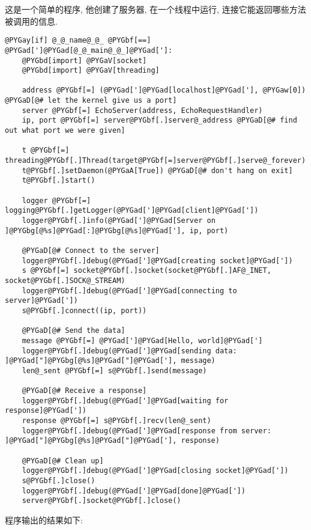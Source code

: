 \documentclass[a4paper,10pt,english]{manual}
\begin{document}
这是一个简单的程序, 他创建了服务器, 在一个线程中运行, 连接它能返回哪些方法被调用的信息.

\begin{Verbatim}[commandchars=@\[\]]
@PYGay[if] @_@_name@_@_ @PYGbf[==] @PYGad[']@PYGad[@_@_main@_@_]@PYGad[']:
    @PYGbd[import] @PYGaV[socket]
    @PYGbd[import] @PYGaV[threading]

    address @PYGbf[=] (@PYGad[']@PYGad[localhost]@PYGad['], @PYGaw[0]) @PYGaD[@# let the kernel give us a port]
    server @PYGbf[=] EchoServer(address, EchoRequestHandler)
    ip, port @PYGbf[=] server@PYGbf[.]server@_address @PYGaD[@# find out what port we were given]

    t @PYGbf[=] threading@PYGbf[.]Thread(target@PYGbf[=]server@PYGbf[.]serve@_forever)
    t@PYGbf[.]setDaemon(@PYGaA[True]) @PYGaD[@# don't hang on exit]
    t@PYGbf[.]start()

    logger @PYGbf[=] logging@PYGbf[.]getLogger(@PYGad[']@PYGad[client]@PYGad['])
    logger@PYGbf[.]info(@PYGad[']@PYGad[Server on ]@PYGbg[@%s]@PYGad[:]@PYGbg[@%s]@PYGad['], ip, port)

    @PYGaD[@# Connect to the server]
    logger@PYGbf[.]debug(@PYGad[']@PYGad[creating socket]@PYGad['])
    s @PYGbf[=] socket@PYGbf[.]socket(socket@PYGbf[.]AF@_INET, socket@PYGbf[.]SOCK@_STREAM)
    logger@PYGbf[.]debug(@PYGad[']@PYGad[connecting to server]@PYGad['])
    s@PYGbf[.]connect((ip, port))

    @PYGaD[@# Send the data]
    message @PYGbf[=] @PYGad[']@PYGad[Hello, world]@PYGad[']
    logger@PYGbf[.]debug(@PYGad[']@PYGad[sending data: ]@PYGad["]@PYGbg[@%s]@PYGad["]@PYGad['], message)
    len@_sent @PYGbf[=] s@PYGbf[.]send(message)

    @PYGaD[@# Receive a response]
    logger@PYGbf[.]debug(@PYGad[']@PYGad[waiting for response]@PYGad['])
    response @PYGbf[=] s@PYGbf[.]recv(len@_sent)
    logger@PYGbf[.]debug(@PYGad[']@PYGad[response from server: ]@PYGad["]@PYGbg[@%s]@PYGad["]@PYGad['], response)

    @PYGaD[@# Clean up]
    logger@PYGbf[.]debug(@PYGad[']@PYGad[closing socket]@PYGad['])
    s@PYGbf[.]close()
    logger@PYGbf[.]debug(@PYGad[']@PYGad[done]@PYGad['])
    server@PYGbf[.]socket@PYGbf[.]close()
\end{Verbatim}

程序输出的结果如下:
\end{document}
